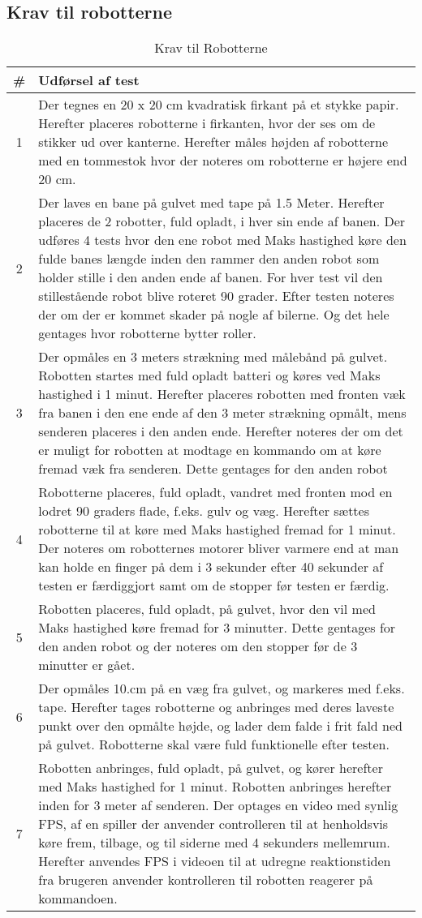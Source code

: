 \subsection{Krav til robotterne}

\begin{table}[]
\centering
\caption{Krav til Robotterne}\label{tab:ASE Krav}
\begin{tabular}{c p{7cm}}
\# & Udførsel af test \\ \midrule
1 & Der tegnes en 20 x 20 cm kvadratisk firkant på et stykke papir. Herefter placeres robotterne i firkanten, hvor der ses om de stikker ud over kanterne. Herefter måles højden af robotterne med en tommestok hvor der noteres om robotterne er højere end 20 cm. \\\midrule
2 & Der laves en bane på gulvet med tape på 1.5 Meter. Herefter placeres de 2 robotter, fuld opladt, i hver sin ende af banen. Der udføres 4 tests hvor den ene robot med Maks hastighed køre den fulde banes længde inden den rammer den anden robot som holder stille i den anden ende af banen. For hver test vil den stillestående robot blive roteret 90 grader. Efter testen noteres der om der er kommet skader på nogle af bilerne. Og det hele gentages hvor robotterne bytter roller. \\\midrule
3 & Der opmåles en 3 meters strækning med målebånd på gulvet. Robotten startes med fuld opladt batteri og køres ved Maks hastighed i 1 minut. Herefter placeres robotten med fronten væk fra banen i den ene ende af den 3 meter strækning opmålt, mens senderen placeres i den anden ende. Herefter noteres der om det er muligt for robotten at modtage en kommando om at køre fremad væk fra senderen. Dette gentages for den anden robot \\\midrule
4 & Robotterne placeres, fuld opladt, vandret med fronten mod en lodret 90 graders flade, f.eks. gulv og væg. Herefter sættes robotterne til at køre med Maks hastighed fremad for 1 minut. Der noteres om robotternes motorer bliver varmere end at man kan holde en finger på dem i 3 sekunder efter 40 sekunder af testen er færdiggjort samt om de stopper før testen er færdig.  \\\midrule
5 & Robotten placeres, fuld opladt, på gulvet, hvor den vil med Maks hastighed køre fremad for 3 minutter. Dette gentages for den anden robot og der noteres om den stopper før de 3 minutter er gået. \\\midrule
6 & Der opmåles 10.cm på en væg fra gulvet, og markeres med f.eks. tape. Herefter tages robotterne og anbringes med deres laveste punkt over den opmålte højde, og lader dem falde i frit fald ned på gulvet. Robotterne skal være fuld funktionelle efter testen.  \\\midrule
7 & Robotten anbringes, fuld opladt, på gulvet, og kører herefter med Maks hastighed for 1 minut. Robotten anbringes herefter inden for 3 meter af senderen. Der optages en video med synlig FPS, af en spiller der anvender controlleren til at henholdsvis køre frem, tilbage, og til siderne med 4 sekunders mellemrum. Herefter anvendes FPS i videoen til at udregne reaktionstiden fra brugeren anvender kontrolleren til robotten reagerer på kommandoen. \\\midrule

\end{tabular}
\end{table}
